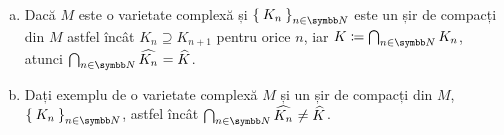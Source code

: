 \setcounter{problem}{7}

\begin{problem}
~
\begin{enumerate}[a)]
    \item Dacă \(M\) este o varietate complexă și \(\Set{ K_n }_{n \in \naturals}\) este un șir de compacți din \(M\) astfel încât \(K_n \supseteq K_{n + 1}\) pentru orice \(n\), iar \(K \coloneq \bigcap_{n \in \naturals} K_n\), atunci \(\bigcap_{n \in \naturals} \holomorphichull{K_n} = \holomorphichull{K}\).
    
    \item Dați exemplu de o varietate complexă \(M\) și un șir de compacți din \(M\), \(\Set{ K_n }_{n \in \naturals}\), astfel încât \(\bigcap_{n \in \naturals} \holomorphichull{K_n} \neq \holomorphichull{K}\).
\end{enumerate}
\end{problem}
